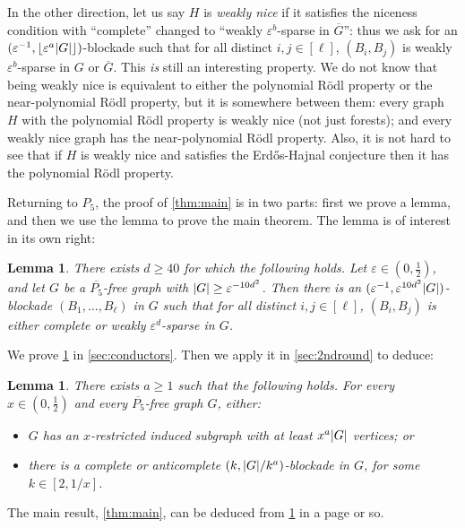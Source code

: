 \documentclass[11pt,reqno,a4paper]{amsart}
\newtheorem{lemma}[theorem]{Lemma}
\newcommand{\eps}{\varepsilon}
\newcommand{\erh}{Erd\H{o}s-Hajnal}
\DeclarePairedDelimiter\abs{\lvert}{\rvert}%
\DeclarePairedDelimiter\floor{\lfloor}{\rfloor}%
\begin{document}
\begin{itemize}
		In the other direction, let us say $H$ is {\em weakly nice} if it satisfies the niceness condition with 
		``complete'' changed to ``weakly $\eps^b$-sparse in $\overline{G}$'': thus we ask for an $(\eps^{-1},\floor{\eps^{a}\abs G})$-blockade such that for all distinct $i,j\in[\ell]$, $(B_i,B_j)$ is weakly $\eps^b$-sparse in $G$ or $\overline G$. 
		This {\em is} still an interesting property. 
		We do not know that being weakly nice is equivalent to either the polynomial R\"odl property or the near-polynomial R\"odl property, but it is somewhere between them: every graph $H$ with the polynomial R\"odl property is weakly nice (not just forests); and every weakly nice graph has the near-polynomial R\"odl property.
		Also, it is not hard to see that if $H$ is weakly nice and satisfies the \erh{} conjecture then it has the polynomial R\"odl property.
	\end{itemize}
	
	Returning to $P_5$, the proof of \cref{thm:main} is in two parts: first we prove a lemma, and then we use the lemma to prove the main theorem. The lemma is of interest in its own right:
	\begin{lemma}
		\label{lem:robust0}
		There exists $d\ge40$ for which the following holds.
		Let $\eps\in(0,\frac12)$, and let $G$ be a $\overline{P_5}$-free graph with $\abs G\ge \eps^{-10d^2}$.
		Then there is an $(\eps^{-1},{\eps^{10d^2}\abs G})$-blockade $(B_1,\ldots,B_{\ell})$ in $G$ such that for all distinct $i,j\in[\ell]$, $(B_i,B_j)$ is either complete or  weakly $\eps^d$-sparse in $G$.
	\end{lemma}
	
	We prove \cref{lem:robust0} in \cref{sec:conductors}.  Then we apply it in \cref{sec:2ndround} to deduce:
	\begin{lemma}
		\label{lem:house0}
		There exists $a\ge1$ such that the following holds.
		For every $x\in(0,\frac12)$ and every $\overline{P_5}$-free graph $G$, either:
		\begin{itemize}
			\item $G$ has an $x$-restricted induced subgraph with at least $x^a\abs G$ vertices; or
			
			\item there is a complete or anticomplete $(k,\abs G/k^a)$-blockade in $G$, for some $k\in[2,1/x]$.
		\end{itemize}
	\end{lemma}
	The main result, \cref{thm:main}, can be deduced from \cref{lem:house0}
	in a page or so.
	
\end{document}
